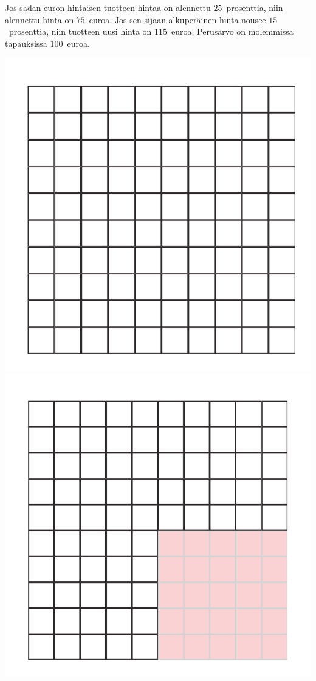 
\begin{esimerkki}
    Jos sadan euron hintaisen tuotteen hintaa on alennettu $25$~prosenttia,
    niin alennettu hinta on $75$~euroa. Jos sen sijaan alkuperäinen
    hinta nousee $15$~prosenttia, niin tuotteen uusi hinta on $115$~euroa.
    Perusarvo on molemmissa tapauksissa $100$~euroa.
    
    \begin{center}
        \includegraphics[scale=.25]{pictures/Kuva13-1-100.pdf}
        \includegraphics[scale=.25]{pictures/Kuva13-2-75.pdf}

\end{center}
\end{esimerkki}
